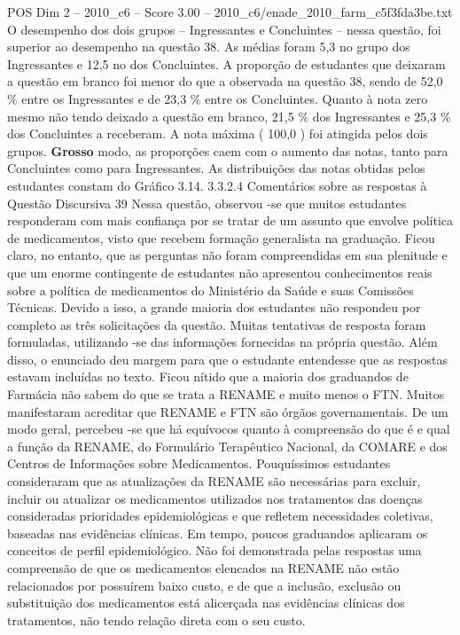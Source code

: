 \begin{textsample}{POS Dim 2 – 2010\_c6 – Score 3.00 – 2010\_c6/enade\_2010\_farm\_c5f3fda3be.txt}
O desempenho dos dois grupos – Ingressantes e Concluintes – nessa questão, foi superior ao desempenho na questão 38.
As médias foram 5,3 no grupo dos Ingressantes e 12,5 no dos Concluintes.
A proporção de estudantes que deixaram a questão em branco foi menor do que a observada na questão 38, sendo de 52,0 \% entre os Ingressantes e de 23,3 \% entre os Concluintes.
Quanto à nota zero mesmo não tendo deixado a questão em branco, 21,5 \% dos Ingressantes e 25,3 \% dos Concluintes a receberam.
A nota máxima ( 100,0 ) foi atingida pelos dois grupos. \textbf{Grosso} modo, as proporções caem com o aumento das notas, tanto para Concluintes como para Ingressantes.
As distribuições das notas obtidas pelos estudantes constam do Gráfico 3.14. 3.3.2.4 Comentários sobre as respostas à Questão Discursiva 39 Nessa questão, observou -se que muitos estudantes responderam com mais confiança por se tratar de um assunto que envolve política de medicamentos, visto que recebem formação generalista na graduação.
Ficou claro, no entanto, que as perguntas não foram compreendidas em sua plenitude e que um enorme contingente de estudantes não apresentou conhecimentos reais sobre a política de medicamentos do Ministério da Saúde e suas Comissões Técnicas.
Devido a isso, a grande maioria dos estudantes não respondeu por completo as três solicitações da questão.
Muitas tentativas de resposta foram formuladas, utilizando -se das informações fornecidas na própria questão.
Além disso, o enunciado deu margem para que o estudante entendesse que as respostas estavam incluídas no texto.
Ficou nítido que a maioria dos graduandos de Farmácia não sabem do que se trata a RENAME e muito menos o FTN.
Muitos manifestaram acreditar que RENAME e FTN são órgãos governamentais.
De um modo geral, percebeu -se que há equívocos quanto à compreensão do que é e qual a função da RENAME, do Formulário Terapêutico Nacional, da COMARE e dos Centros de Informações sobre Medicamentos.
Pouquíssimos estudantes consideraram que as atualizações da RENAME são necessárias para excluir, incluir ou atualizar os medicamentos utilizados nos tratamentos das doenças consideradas prioridades epidemiológicas e que refletem necessidades coletivas, baseadas nas evidências clínicas.
Em tempo, poucos graduandos aplicaram os conceitos de perfil epidemiológico.
Não foi demonstrada pelas respostas uma compreensão de que os medicamentos elencados na RENAME não estão relacionados por possuírem baixo custo, e de que a inclusão, exclusão ou substituição dos medicamentos está alicerçada nas evidências clínicas dos tratamentos, não tendo relação direta com o seu custo.

\end{textsample}
